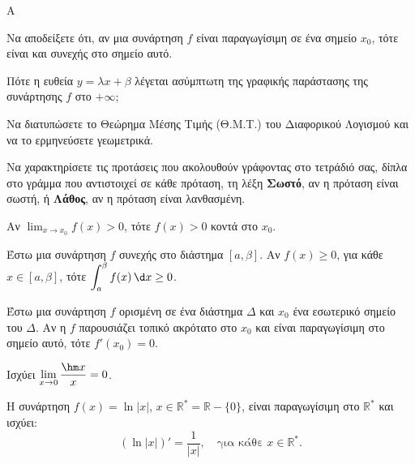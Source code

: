\begin{thema}{Α}
\begin{erwthma}
    \item Να αποδείξετε ότι, αν μια συνάρτηση $f$ είναι παραγωγίσιμη σε ένα σημείο $x_0$, τότε είναι και συνεχής στο σημείο αυτό. 

    \item Πότε η ευθεία $y = \lambda x + \beta$ λέγεται ασύμπτωτη της γραφικής παράστασης της συνάρτησης $f$ στο $+\infty$; 

    \item Να διατυπώσετε το Θεώρημα Μέσης Τιμής (Θ.Μ.Τ.) του Διαφορικού Λογισμού και να το ερμηνεύσετε γεωμετρικά. 

    \item Να χαρακτηρίσετε τις προτάσεις που ακολουθούν γράφοντας στο τετράδιό σας, δίπλα στο γράμμα που αντιστοιχεί σε κάθε πρόταση, τη λέξη \textbf{Σωστό}, αν η πρόταση είναι σωστή, ή \textbf{Λάθος}, αν η πρόταση είναι λανθασμένη.
    \begin{alist}
        \item Αν $\displaystyle\lim_{x \to x_0} f(x) > 0$, τότε $f(x) > 0$ κοντά στο $x_0$.

        \item Έστω μια συνάρτηση $f$ συνεχής στο διάστημα $[a, \beta]$. Αν $f(x) \geq 0$, για κάθε $x \in [a, \beta]$, τότε $\displaystyle\int_a^\beta f(x)\,\d x \geq 0$.

        \item Έστω μια συνάρτηση $f$ ορισμένη σε ένα διάστημα $\Delta$ και $x_0$ ένα εσωτερικό σημείο του $\Delta$. Αν η $f$ παρουσιάζει τοπικό ακρότατο στο $x_0$ και είναι παραγωγίσιμη στο σημείο αυτό, τότε $f'(x_0) = 0$.

        \item Ισχύει $\displaystyle\lim_{x \to 0} \dfrac{\hm x}{x} = 0$.

        \item Η συνάρτηση $f(x) = \ln|x|$, $x \in \mathbb{R}^* = \mathbb{R} - \{0\}$, είναι παραγωγίσιμη στο $\mathbb{R}^*$ και ισχύει:
        \[
        (\ln|x|)' = \frac{1}{|x|}, \quad \text{για κάθε } x \in \mathbb{R}^*.
        \]
    \end{alist}
\end{erwthma}
\end{thema}

